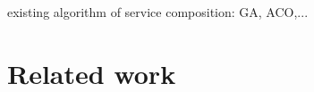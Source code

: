 \documentclass[senior,final,11pt]{iscs-thesis}
\begin{document}

existing algorithm of service composition: GA, ACO,...

\chapter{Related  work}
\end{document}
